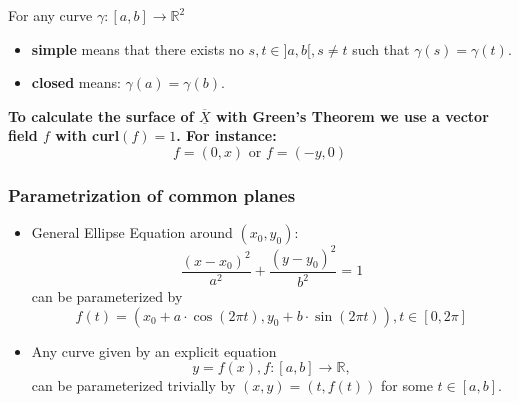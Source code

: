 \documentclass[a4paper,fontsize = 10pt]{article}
\def\R{\mathbb{R}}
\def\X{\underline{\overline{X}}}
\begin{document}
For any curve $\gamma: [a,b] \to \R^2$ 
\begin{itemize}
  \item \textbf{simple} means that there exists no $s, t \in ]a,b[, s \neq t$ such that $\gamma(s) = \gamma(t)$. 
  \item \textbf{closed} means: $\gamma(a) = \gamma(b)$.
\end{itemize}
\textbf{To calculate the surface of $\X$ with Green's Theorem we use a vector field $f$ with curl$(f) = 1$. For instance: \[f = (0,x) \text{ or } f = (-y, 0)\]}

\subsubsection*{Parametrization of common planes}
\begin{itemize}
  \item General Ellipse Equation around $(x_0, y_0)$: $$\frac{(x-x_0)^2}{a^2} + \frac{(y-y_0)^2}{b^2} = 1$$ can be parameterized by $$f(t) = (x_0 + a \cdot \cos(2\pi t), y_0 + b \cdot \sin(2\pi t)), t \in [0, 2\pi]$$
  \item Any curve given by an explicit equation $$y = f(x), f: [a,b] \to \R,$$ can be parameterized trivially by $(x, y) = (t, f(t))$ for some $t \in [a, b]$.
\end{itemize}
\end{document}
